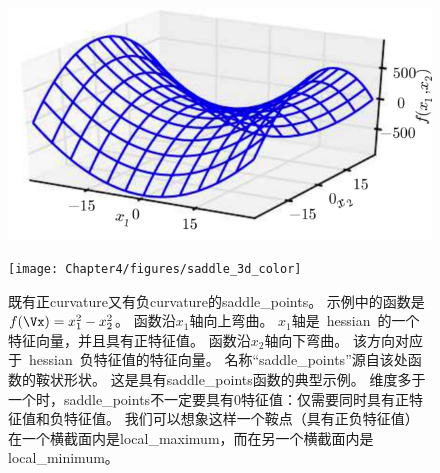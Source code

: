 \begin{figure}[!htb]
\ifOpenSource
\centerline{\includegraphics[scale=0.5]{images/28.png}}
\else
\centerline{\texttt{[image: Chapter4/figures/saddle\_3d\_color]}}
\fi
\caption{既有正\gls{curvature}又有负\gls{curvature}的\gls{saddle_points}。
示例中的函数是$f(\Vx) = x_1^2 - x_2^2$。
函数沿$x_1$轴向上弯曲。
$x_1$轴是~\gls{hessian}~的一个特征向量，并且具有正特征值。
函数沿$x_2$轴向下弯曲。
该方向对应于~\gls{hessian}~负特征值的特征向量。
名称``\gls{saddle_points}''源自该处函数的鞍状形状。
这是具有\gls{saddle_points}函数的典型示例。
维度多于一个时，\gls{saddle_points}不一定要具有0特征值：仅需要同时具有正特征值和负特征值。
我们可以想象这样一个鞍点（具有正负特征值）在一个横截面内是\gls{local_maximum}，而在另一个横截面内是\gls{local_minimum}。
}
\label{fig:chap4_saddle_3d_color}
\end{figure}

